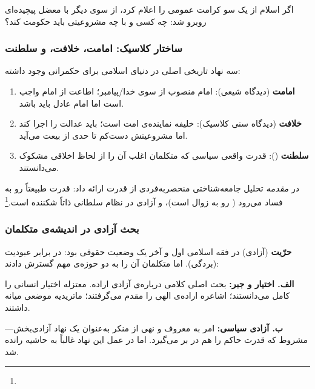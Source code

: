 اگر اسلام از یک سو کرامت عمومی را اعلام کرد، از سوی دیگر با معضل پیچیده‌ای روبرو شد: چه کسی و با چه مشروعیتی باید حکومت کند؟

\subsubsection{ساختار کلاسیک: امامت، خلافت، و سلطنت}

سه نهاد تاریخی اصلی در دنیای اسلامی برای حکمرانی وجود داشته:

\begin{enumerate}
  \item \textbf{امامت} (دیدگاه شیعی): امام منصوب از سوی خدا/پیامبر؛ اطاعت از امام واجب است اما امام عادل باید باشد.
  \item \textbf{خلافت} (دیدگاه سنی کلاسیک): خلیفه نماینده‌ی امت است؛ باید عدالت را اجرا کند اما مشروعیتش دست‌کم تا حدی از بیعت می‌آید.
  \item \textbf{سلطنت} (): قدرت واقعی سیاسی که متکلمان اغلب آن را از لحاظ اخلاقی مشکوک می‌دانستند.
\end{enumerate}

 در \textit{مقدمه} تحلیل جامعه‌شناختی منحصربه‌فردی از قدرت ارائه داد: قدرت طبیعتاً رو به فساد می‌رود ( رو به زوال است)، و آزادی در نظام سلطانی ذاتاً شکننده است.\footnote{} %

\subsubsection{بحث آزادی در اندیشه‌ی متکلمان}

\begin{tcolorbox}[defbox, title={فقه‌الحریه: مفهوم آزادی در فقه و کلام اسلامی}]

\textbf{حرّیت} (آزادی) در فقه اسلامی اول و آخر یک وضعیت حقوقی بود: در برابر عبودیت (بردگی). اما متکلمان آن را به دو حوزه‌ی مهم گسترش دادند:

\textbf{الف. اختیار و جبر:} بحث اصلی کلامی درباره‌ی آزادی اراده. معتزله اختیار انسانی را کامل می‌دانستند؛ اشاعره اراده‌ی الهی را مقدم می‌گرفتند؛ ماتریدیه موضعی میانه داشتند.

\textbf{ب. آزادی سیاسی:} امر به معروف و نهی از منکر به‌عنوان یک نهاد آزادی‌بخش—مشروط که قدرت حاکم را هم در بر می‌گیرد. اما در عمل این نهاد غالباً به حاشیه رانده شد.
\end{tcolorbox}


